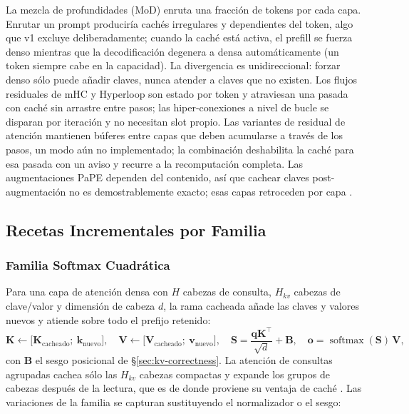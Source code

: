 La mezcla de profundidades (MoD) enruta una fracción de tokens por cada capa. Enrutar un prompt produciría cachés irregulares y dependientes del token, algo que v1 excluye deliberadamente; cuando la caché está activa, el prefill se fuerza denso mientras que la decodificación degenera a densa automáticamente (un token siempre cabe en la capacidad). La divergencia es unidireccional: forzar denso sólo puede añadir claves, nunca atender a claves que no existen. Los flujos residuales de mHC y Hyperloop son estado por token y atraviesan una pasada con caché sin arrastre entre pasos; las hiper-conexiones a nivel de bucle se disparan por iteración y no necesitan slot propio. Las variantes de residual de atención mantienen búferes entre capas que deben acumularse a través de los pasos, un modo aún no implementado; la combinación deshabilita la caché para esa pasada con un aviso y recurre a la recomputación completa. Las augmentaciones PaPE dependen del contenido, así que cachear claves post-augmentación no es demostrablemente exacto; esas capas retroceden por capa \citep{ohrstrom_pape_2026}.

\subsection{Recetas Incrementales por Familia}
\label{sec:kv-recipes}

\subsubsection{Familia Softmax Cuadrática}

Para una capa de atención densa con $H$ cabezas de consulta, $H_{kv}$ cabezas de clave/valor y dimensión de cabeza $d$, la rama cacheada añade las claves y valores nuevos y atiende sobre todo el prefijo retenido:
\[
\mathbf{K} \gets \big[\mathbf{K}_{\text{cacheado}};\ \mathbf{k}_{\text{nuevo}}\big],\quad
\mathbf{V} \gets \big[\mathbf{V}_{\text{cacheado}};\ \mathbf{v}_{\text{nuevo}}\big],\quad
\mathbf{S} = \frac{\mathbf{q}\mathbf{K}^\top}{\sqrt d} + \mathbf{B},\quad
\mathbf{o} = \operatorname{softmax}(\mathbf{S})\,\mathbf{V},
\]
con $\mathbf{B}$ el sesgo posicional de \S\ref{sec:kv-correctness}. La atención de consultas agrupadas cachea sólo las $H_{kv}$ cabezas compactas y expande los grupos de cabezas después de la lectura, que es de donde proviene su ventaja de caché \citep{ainslie_gqa_2023}. Las variaciones de la familia se capturan sustituyendo el normalizador o el sesgo:

